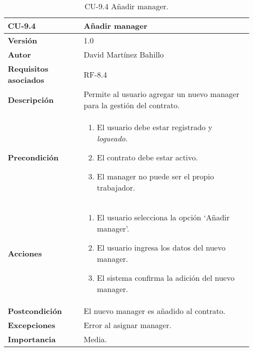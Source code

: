 \begin{table}[p]
	\centering
	\begin{tabularx}{\linewidth}{ p{} p{} }
		\toprule
		\textbf{CU-9.4}  & \textbf{Añadir manager}\\
		\midrule
		\textbf{Versión}              & 1.0    \\
		\textbf{Autor}                & David Martínez Bahillo \\
		\textbf{Requisitos asociados} & RF-8.4 \\
		\textbf{Descripción}          & Permite al usuario agregar un nuevo manager para la gestión del contrato. \\
		\textbf{Precondición}         &  
		\begin{enumerate}
			\item El usuario debe estar registrado y \textit{logueado}.
			\item El contrato debe estar activo.
			\item El manager no puede ser el propio trabajador.
		\end{enumerate}\\
		\textbf{Acciones}             &
		\begin{enumerate}
			\item El usuario selecciona la opción `Añadir manager'.
			\item El usuario ingresa los datos del nuevo manager.
			\item El sistema confirma la adición del nuevo manager.
		\end{enumerate}\\
		\textbf{Postcondición}        & El nuevo manager es añadido al contrato. \\
		\textbf{Excepciones}          & Error al asignar manager. \\
		\textbf{Importancia}          & Media. \\
		\bottomrule
	\end{tabularx}
	\caption{CU-9.4 Añadir manager.}
\end{table}


